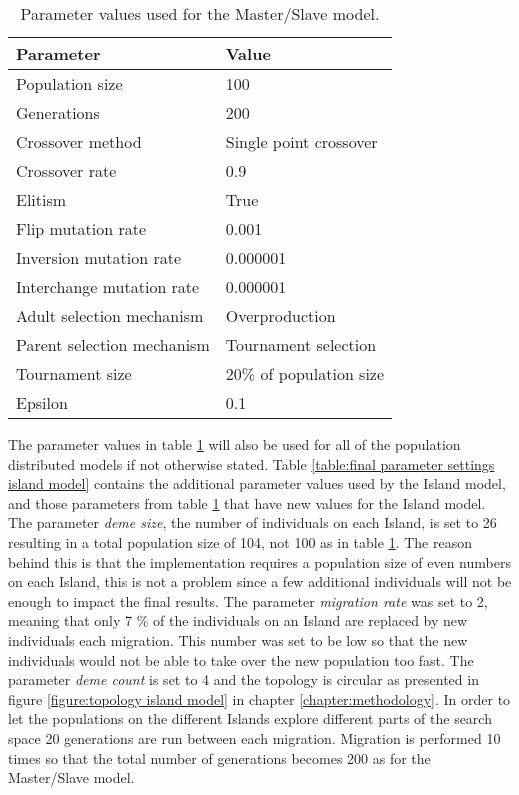 \begin{table}[h!]
\centering
\caption{Parameter values used for the Master/Slave model.}
\label{table:final parameter settings master slave model}
\begin{tabular}{l|l}
\textbf{Parameter} & \textbf{Value} \\ 
\hline 
Population size & 100 \\  
Generations & 200 \\ 
Crossover method & Single point crossover \\ 
Crossover rate & 0.9 \\ 
Elitism & True \\ 
Flip mutation rate & 0.001 \\ 
Inversion mutation rate & 0.000001 \\ 
Interchange mutation rate & 0.000001 \\ 
Adult selection mechanism & Overproduction \\ 
Parent selection mechanism & Tournament selection \\ 
Tournament size & 20\% of population size\\ 
Epsilon & 0.1 \\ 
\end{tabular} 
\end{table}

\noindent The parameter values in table \ref{table:final parameter settings master slave model} will also be used for all of the population distributed models if not otherwise stated. Table \ref{table:final parameter settings island model} contains the additional parameter values used by the Island model, and those parameters from table \ref{table:final parameter settings master slave model} that have new values for the Island model. The parameter \textit{deme size}, the number of individuals on each Island, is set to 26 resulting in a total population size of 104, not 100 as in table \ref{table:final parameter settings master slave model}. The reason behind this is that the implementation requires a population size of even numbers on each Island, this is not a problem since a few additional individuals will not be enough to impact the final results. The parameter \textit{migration rate} was set to 2, meaning that only 7 \% of the individuals on an Island are replaced by new individuals each migration. This number was set to be low so that the new individuals would not be able to take over the new population too fast. The parameter \textit{deme count} is set to 4 and the topology is circular as presented in figure \ref{figure:topology island model} in chapter \ref{chapter:methodology}. In order to let the populations on the different Islands explore different parts of the search space 20 generations are run between each migration. Migration is performed 10 times so that the total number of generations becomes 200 as for the Master/Slave model.\\

